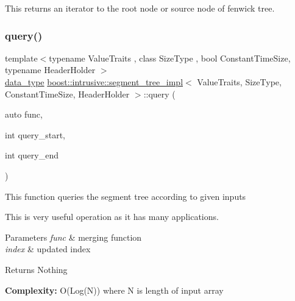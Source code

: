 This returns an iterator to the root node or source node of fenwick tree. \mbox{\label{classboost_1_1intrusive_1_1segment__tree__impl_ad0aa848ccb9520e36cf4dfbf9149b150}} 
\subsubsection{\texorpdfstring{query()}{query()}}
{\footnotesize\ttfamily template$<$typename Value\+Traits , class Size\+Type , bool Constant\+Time\+Size, typename Header\+Holder $>$ \\
\hyperlink{classboost_1_1intrusive_1_1segment__tree__impl_a92c83c631da1bcdaa004756ea98b2ec5}{data\+\_\+type} \hyperlink{classboost_1_1intrusive_1_1segment__tree__impl}{boost\+::intrusive\+::segment\+\_\+tree\+\_\+impl}$<$ Value\+Traits, Size\+Type, Constant\+Time\+Size, Header\+Holder $>$\+::query (\begin{DoxyParamCaption}\item[{auto}]{func,  }\item[{int}]{query\+\_\+start,  }\item[{int}]{query\+\_\+end }\end{DoxyParamCaption})\hspace{0.3cm}{\ttfamily [inline]}}


\begin{DoxyItemize}
\item This function queries the segment tree according to given inputs  
\item This is very useful operation as it has many applications.  
\end{DoxyItemize}
\begin{DoxyParams}{Parameters}
{\em func} & merging function \\
\hline
{\em index} & updated index \\
\hline
\end{DoxyParams}
\begin{DoxyReturn}{Returns}
Nothing 
\end{DoxyReturn}


{\bfseries  Complexity\+: } O(\+Log(\+N)) where N is length of input array \mbox{\label{classboost_1_1intrusive_1_1segment__tree__impl_a527965bd8a82b220f6a46c65fb97c335}} 
